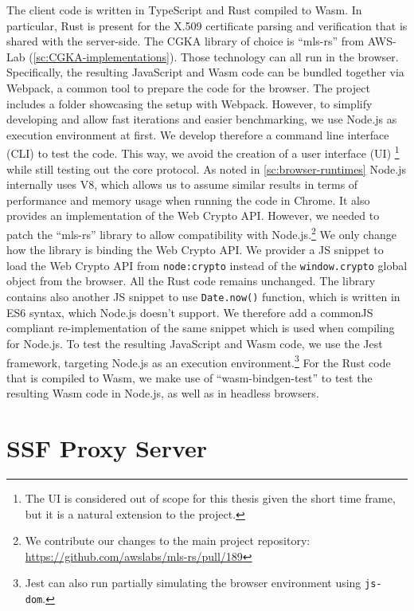 The client code is written in TypeScript and Rust compiled to Wasm.
In particular, Rust is present for the X.509 certificate parsing and
verification that is shared with the server-side.
The CGKA library of choice is ``mls-rs'' from AWS-Lab (\cref{sc:CGKA-implementations}).
Those technology can all run in the browser. Specifically,
the resulting JavaScript and Wasm code can be bundled
together via Webpack, a common tool to prepare
the code for the browser.
The project includes a folder showcasing the setup with
Webpack.
However, to simplify developing and allow fast iterations and easier benchmarking,
we use Node.js as execution environment at first.
We develop therefore a command line interface (CLI) to test the code.
This way, we avoid the creation of a user
interface (UI)
\footnote{The UI is considered out of scope for this thesis given the short time frame, but it is a natural extension to the project.}
while still testing out the core protocol. 
As noted in \cref{sc:browser-runtimes}
Node.js internally uses V8, which allows us to assume
similar results in terms of performance and memory usage
when running the code in Chrome. It also provides
an implementation of the Web Crypto API.
However, we needed to patch the ``mls-rs'' library
to allow compatibility with Node.js.\footnote{We contribute our changes to the main project repository: \url{https://github.com/awslabs/mls-rs/pull/189}}
We only change how the library is binding the Web Crypto API.
We provider a JS snippet to load the Web Crypto API from
\texttt{node:crypto} instead of the \texttt{window.crypto} global
object from the browser. All the Rust code remains
unchanged. The library contains also another JS snippet
to use \texttt{Date.now()} function, which is written in
ES6 syntax, which Node.js doesn't support.
We therefore add a commonJS compliant re-implementation
of the same snippet which is used
when compiling for Node.js.
To test the resulting JavaScript and Wasm code, we use the Jest~\cite{Jest}
framework, targeting Node.js as an execution environment.\footnote{Jest can also run partially simulating the browser environment using \texttt{js-dom}.}
For the Rust code that is compiled to Wasm, we make use of
``wasm-bindgen-test'' to test the resulting Wasm code in 
Node.js, as well as in headless browsers.



\section{SSF Proxy Server}\label{sc:ssf-proxy-server}






